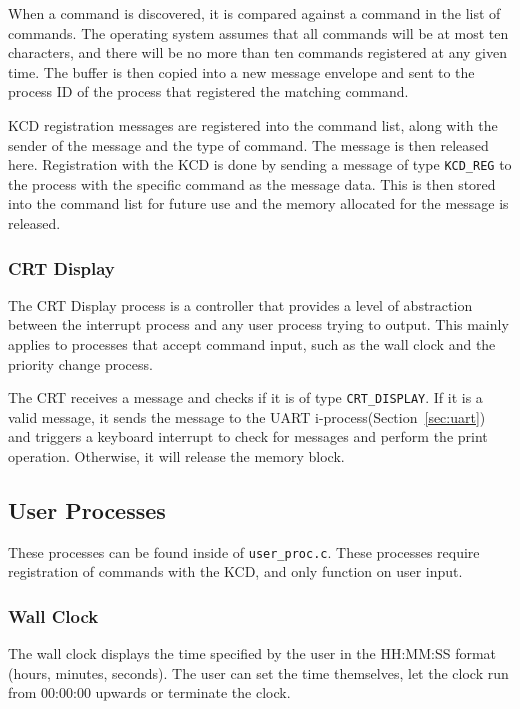 \documentclass[se]{uw-wkrpt}
\begin{document}
When a command is discovered, it is compared against a command in the list of commands. The operating system assumes that all commands will be at most ten characters, and there will be no more than ten commands registered at any given time. The buffer is then copied into a new message envelope and sent to the process ID of the process that registered the matching command.

KCD registration messages are registered into the command list, along with the sender of the message and the type of command. The message is then released here. Registration with the KCD is done by sending a message of type \texttt{KCD\_REG} to the process with the specific command as the message data. This is then stored into the command list for future use and the memory allocated for the message is released.


\subsubsection{CRT Display}

The CRT Display process is a controller that provides a level of abstraction between the interrupt process and any user process trying to output. This mainly applies to processes that accept command input, such as the wall clock and the priority change process. 

The CRT receives a message and checks if it is of type \texttt{CRT\_DISPLAY}. If it is a valid message, it sends the message to the UART i-process(Section~\ref{sec:uart}) and triggers a keyboard interrupt to check for messages and perform the print operation. Otherwise, it will release the memory block.

\subsection{User Processes}

These processes can be found inside of \texttt{user\_proc.c}. These processes require registration of commands with the KCD, and only function on user input.

\subsubsection{Wall Clock}

The wall clock displays the time specified by the user in the HH:MM:SS format (hours, minutes, seconds). The user can set the time themselves, let the clock run from 00:00:00 upwards or terminate the clock.
\end{document}
